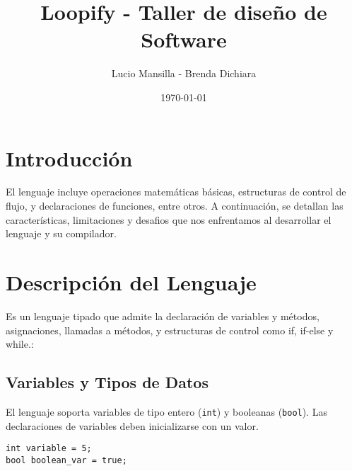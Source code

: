 \documentclass{article}
\title{Loopify - Taller de diseño de Software}
\author{Lucio Mansilla - Brenda Dichiara}
\date{\today}
\begin{document}
\maketitle

\tableofcontents

\section{Introducción}
El lenguaje incluye operaciones matemáticas básicas, estructuras de control de flujo, y declaraciones de funciones, entre otros. A continuación, se detallan las características, limitaciones y desafios que nos enfrentamos al desarrollar el lenguaje y su compilador.

\section{Descripción del Lenguaje}

Es un lenguaje tipado que admite la declaración de variables y métodos, asignaciones, llamadas a métodos, y estructuras de control como if, if-else y while.:

\subsection{Variables y Tipos de Datos}

El lenguaje soporta variables de tipo entero (\texttt{int}) y booleanas (\texttt{bool}). Las declaraciones de variables deben inicializarse con un valor.

\begin{verbatim}
int variable = 5;
bool boolean_var = true;
\end{verbatim}
\end{document}

